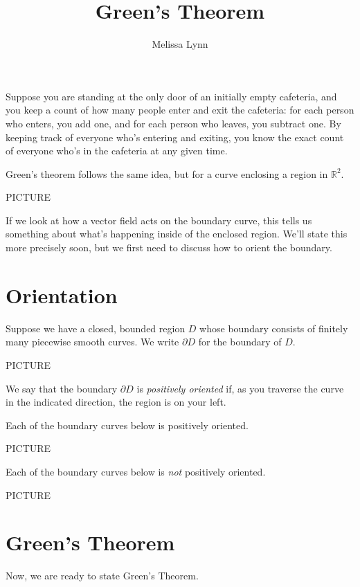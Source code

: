 \documentclass{ximera}
\title{Green's Theorem}
\author{Melissa Lynn}
\begin{document}
  
\begin{abstract}  
\end{abstract}  
\maketitle  

Suppose you are standing at the only door of an initially empty cafeteria, and you keep a count of how many people enter and exit the cafeteria: for each person who enters, you add one, and for each person who leaves, you subtract one. By keeping track of everyone who's entering and exiting, you know the exact count of everyone who's in the cafeteria at any given time.

Green's theorem follows the same idea, but for a curve enclosing a region in $\mathbb{R}^2$.

PICTURE

If we look at how a vector field acts on the boundary curve, this tells us something about what's happening inside of the enclosed region. We'll state this more precisely soon, but we first need to discuss how to orient the boundary.

\section*{Orientation}

Suppose we have a closed, bounded region $D$ whose boundary consists of finitely many piecewise smooth curves. We write $\partial D$ for the boundary of $D$.

PICTURE

We say that the boundary $\partial D$ is \emph{positively oriented} if, as you traverse the curve in the indicated direction, the region is on your left.

\begin{example}
Each of the boundary curves below is positively oriented.

PICTURE

Each of the boundary curves below is \emph{not} positively oriented.

PICTURE
\end{example}

\section*{Green's Theorem}

Now, we are ready to state Green's Theorem.
\end{document}
